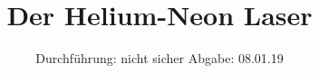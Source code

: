 

\subject{V 61}
\title{Der Helium-Neon Laser}
\date{
  Durchführung: nicht sicher
  \hspace{3em}
  Abgabe: 08.01.19
}



\maketitle
\thispagestyle{empty}
\tableofcontents
\newpage






\printbibliography




